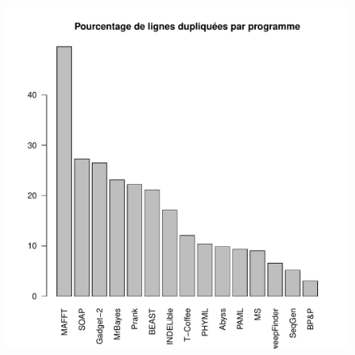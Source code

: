 \begin{figure}[!h]
  \includegraphics[width=\linewidth]{figures/pdlin_prog.pdf}
  \caption{}\label{fig:pdlin_prog}
  \endminipage\hfill
\end{figure}